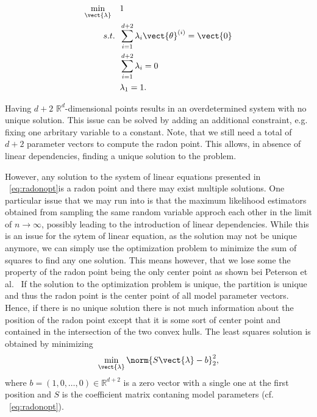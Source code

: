\begin{equation}
    \label{eq:radonopt}
    \begin{split}
        \min_{\vect{\lambda}} \quad &1 \\
        s.t. \;\; &\sum_{i=1}^{d+2} \lambda_i \vect{\theta}^{(i)} = \vect{0}\\
             \;\; &\sum_{i=1}^{d+2} \lambda_i = 0 \\
             \; \; & \lambda_1 = 1.
    \end{split}
\end{equation}

Having $d+2$ $\mathbb{R}^d$-dimensional points results in an overdetermined system with no unique solution.
This issue can be solved by adding an additional constraint, e.g. fixing one arbritary variable to a constant. 
Note, that we still need a total of $d+2$ parameter vectors to compute the radon point.
This allows, in absence of linear dependencies, finding a unique solution to the problem.

However, any solution to the system of linear equations presented in \eq~\ref{eq:radonopt}is a radon point and there may exist multiple solutions.
One particular issue that we may run into is that the maximum likelihood estimators obtained from sampling the same random variable approch each other in the limit of $n \rightarrow \infty$, possibly leading to the introduction of linear dependencies.
While this is an issue for the sytem of linear equation, as the solution may not be unique anymore, we can simply use the optimization problem to minimize the sum of squares to find any one solution.
This means however, that we lose some the property of the radon point being the only center point as shown bei Peterson et al.~\cite{peterson1972geometry}
If the solution to the optimization problem is unique, the partition is unique and thus the radon point is the center point of all model parameter vectors.
Hence, if there is no unique solution there is not much information about the position of the radon point except that it is some sort of center point and contained in the intersection of the two convex hulls.
The least squares solution is obtained by minimizing
\begin{equation}
    \label{eq:lstsq}
        \min_{\vect{\lambda}} \norm{S\vect{\lambda} - b}^2_2,
\end{equation}
where $b=(1, 0, \ldots, 0) \in \mathbb{R}^{d+2}$ is a zero vector with a single one at the first position and $S$ is the coefficient matrix contaning model parameters (cf. \eq~\ref{eq:radonopt}).

